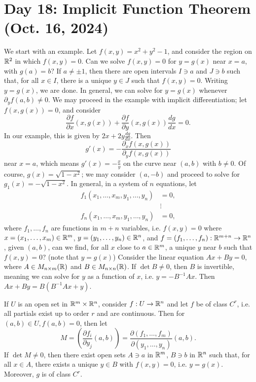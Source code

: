 \section{Day 18: Implicit Function Theorem (Oct. 16, 2024)}
We start with an example. Let $f(x, y) = x^2 + y^2 - 1$, and consider the region on $\mathbb R^2$ in which $f(x, y) = 0$. Can we solve $f(x, y) = 0$ for $y = g(x)$ near $x = a$, with $g(a) = b$? If $a \neq \pm 1$, then there are open intervals $I \ni a$ and $J \ni b$ such that, for all $x \in I$, there is a unique $y \in J$ such that $f(x, y) = 0$. Writing $y = g(x)$, we are done.
\medskip\newline
In general, we can solve for $y = g(x)$ whenever $\partial_y f (a, b) \neq 0$. We may proceed in the example with implicit differentiation; let $f(x, g(x)) = 0$, and consider
\[ \frac{\partial f}{\partial x} (x, g(x)) + \frac{\partial f}{\partial y}(x, g(x)) \frac{dg}{dx} = 0. \]
In our example, this is given by $2x + 2y \frac{dg}{dx}$. Then
\[ g'(x) = -\frac{\partial_x f(x, g(x))}{\partial_y f(x, g(x))} \]
near $x = a$, which means $g'(x) = -\frac{x}{y}$ on the curve near $(a, b)$ with $b \neq 0$. Of course, $g(x) = \sqrt{1 - x^2}$; we may consider $(a, -b)$ and proceed to solve for $g_1(x) = -\sqrt{1 - x^2}$.
\medskip\newline
In general, in a system of $n$ equations, let
\begin{align*}
    f_1(x_1, \dots, x_m, y_1, \dots, y_n) &= 0, \\
    &\vdots \\
    f_n(x_1, \dots, x_m, y_1, \dots, y_n) &= 0,
\end{align*}
where $f_1, \dots, f_n$ are functions in $m + n$ variables, i.e. $f(x, y) = 0$ where $x = (x_1, \dots, x_m) \in \mathbb R^m$, $y = (y_1, \dots, y_n) \in \mathbb R^n$, and $f = (f_1, \dots, f_n) : \mathbb R^{m+n} \to \mathbb R^n$, given $(a, b)$, can we find, for all $x$ close to $a \in \mathbb R^m$, a unique $y$ near $b$ such that $f(x, y) = 0$? (note that $y = g(x)$)
\medskip\newline
Consider the linear equation $Ax + By = 0$, where $A \in M_{n \times m}(\mathbb R)$ and $B \in M_{n \times n}(\mathbb R)$. If $\det B \neq 0$, then $B$ is invertible, meaning we can solve for $y$ as a function of $x$, i.e. $y = -B^{-1}Ax$. Then $Ax + By = B(B^{-1} Ax + y)$.
\begin{simplethm}
    If $U$ is an open set in $\mathbb R^m \times \mathbb R^n$, consider $f : U \to \mathbb R^n$ and let $f$ be of class $C^r$, i.e. all partials exist up to order $r$ and are continuous. Then for $(a, b) \in U, f(a, b) = 0$, then let
    \[ M = \left(\frac{\partial f_i}{\partial y_j} (a, b)\right) = \frac{\partial (f_1, \dots, f_m)}{\partial (y_1, \dots, y_n)}(a, b). \]
    If $\det M \neq 0$, then there exist open sets $A \ni a$ in $\mathbb R^m$, $B \ni b$ in $\mathbb R^n$ such that, for all $x \in A$, there exists a unique $y \in B$ with $f(x, y) = 0$, i.e. $y = g(x)$. Moreover, $g$ is of class $C^r$.
\end{simplethm}

